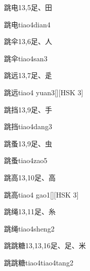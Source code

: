 \begin{entry}{跳电}{13,5}{⾜、⽥}
  \begin{phonetics}{跳电}{tiao4dian4}
  \end{phonetics}
\end{entry}

\begin{entry}{跳伞}{13,6}{⾜、⼈}
  \begin{phonetics}{跳伞}{tiao4san3}
  \end{phonetics}
\end{entry}

\begin{entry}{跳远}{13,7}{⾜、⾡}
  \begin{phonetics}{跳远}{tiao4 yuan3}[][HSK 3]
  \end{phonetics}
\end{entry}

\begin{entry}{跳挡}{13,9}{⾜、⼿}
  \begin{phonetics}{跳挡}{tiao4dang3}
  \end{phonetics}
\end{entry}

\begin{entry}{跳蚤}{13,9}{⾜、⾍}
  \begin{phonetics}{跳蚤}{tiao4zao5}
  \end{phonetics}
\end{entry}

\begin{entry}{跳高}{13,10}{⾜、⾼}
  \begin{phonetics}{跳高}{tiao4 gao1}[][HSK 3]
  \end{phonetics}
\end{entry}

\begin{entry}{跳绳}{13,11}{⾜、⽷}
  \begin{phonetics}{跳绳}{tiao4sheng2}
  \end{phonetics}
\end{entry}

\begin{entry}{跳跳糖}{13,13,16}{⾜、⾜、⽶}
  \begin{phonetics}{跳跳糖}{tiao4tiao4tang2}
  \end{phonetics}
\end{entry}

